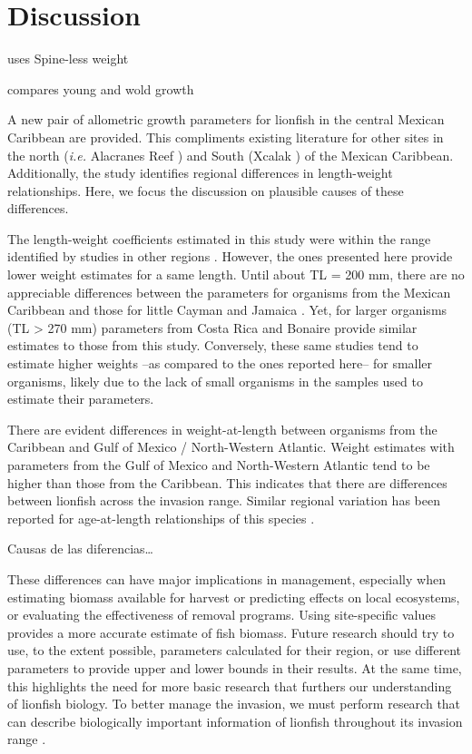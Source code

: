 \documentclass[fleqn,10pt,lineno]{wlpeerj} %
\begin{document}
\clearpage

\section{Discussion}\label{discussion}

\citet{fogg_2013} uses Spine-less weight

\citet{toledohernndez_2014} compares young and wold growth

A new pair of allometric growth parameters for lionfish in the central
Mexican Caribbean are provided. This compliments existing literature for
other sites in the north (\emph{i.e.} Alacranes Reef
\citep{aguilarperera_2016}) and South (Xcalak \citep{sabidoitza_2016})
of the Mexican Caribbean. Additionally, the study identifies regional
differences in length-weight relationships. Here, we focus the
discussion on plausible causes of these differences.

The length-weight coefficients estimated in this study were within the
range identified by studies in other regions
\citep{barbour_2011,fogg_2013,aguilarperera_2016,sabidoitza_2016,edwards_2014,chin_2016,deleon_2013,sandel_2015}.
However, the ones presented here provide lower weight estimates for a
same length. Until about TL = 200 mm, there are no appreciable
differences between the parameters for organisms from the Mexican
Caribbean and those for little Cayman \citep{edwards_2014} and Jamaica
\citep{chin_2016}. Yet, for larger organisms (TL \textgreater{} 270 mm)
parameters from Costa Rica \citep{sandel_2015} and Bonaire
\citep{deleon_2013} provide similar estimates to those from this study.
Conversely, these same studies tend to estimate higher weights --as
compared to the ones reported here-- for smaller organisms, likely due
to the lack of small organisms in the samples used to estimate their
parameters.

There are evident differences in weight-at-length between organisms from
the Caribbean and Gulf of Mexico / North-Western Atlantic. Weight
estimates with parameters from the Gulf of Mexico and North-Western
Atlantic tend to be higher than those from the Caribbean. This indicates
that there are differences between lionfish across the invasion range.
Similar regional variation has been reported for age-at-length
relationships of this species \citep{fogg_2015,pusack_2016}.

Causas de las diferencias\ldots{}

These differences can have major implications in management, especially
when estimating biomass available for harvest or predicting effects on
local ecosystems, or evaluating the effectiveness of removal programs.
Using site-specific values provides a more accurate estimate of fish
biomass. Future research should try to use, to the extent possible,
parameters calculated for their region, or use different parameters to
provide upper and lower bounds in their results. At the same time, this
highlights the need for more basic research that furthers our
understanding of lionfish biology. To better manage the invasion, we
must perform research that can describe biologically important
information of lionfish throughout its invasion range
\citep{johnson_2016}.
\end{document}
